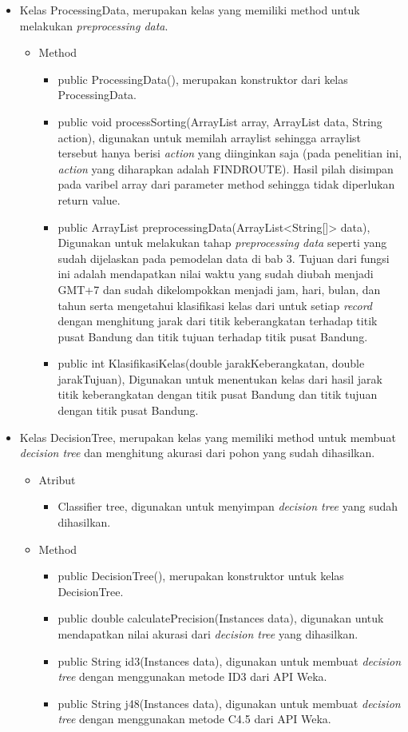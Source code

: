 \begin{itemize}
	\item Kelas ProcessingData, merupakan kelas yang memiliki method untuk melakukan \textsl{preprocessing data}.
	\begin{itemize}
		\item Method
		\begin{itemize}
			\item public ProcessingData(), merupakan konstruktor dari kelas ProcessingData.
			\item public void processSorting(ArrayList array, ArrayList data, String action), digunakan untuk memilah arraylist sehingga arraylist tersebut hanya berisi \textsl{action} yang diinginkan saja (pada penelitian ini, \textsl{action} yang diharapkan adalah FINDROUTE). Hasil pilah disimpan pada varibel array dari parameter method sehingga tidak diperlukan return value.
			\item public ArrayList preprocessingData(ArrayList<String[]> data), Digunakan untuk melakukan tahap \textsl{preprocessing data} seperti yang sudah dijelaskan pada pemodelan data di bab 3. Tujuan dari fungsi ini adalah mendapatkan nilai waktu yang sudah diubah menjadi GMT+7 dan sudah dikelompokkan menjadi jam, hari, bulan, dan tahun serta mengetahui klasifikasi kelas dari untuk setiap \textsl{record} dengan menghitung jarak dari titik keberangkatan terhadap titik pusat Bandung dan titik tujuan terhadap titik pusat Bandung.
			\item public int KlasifikasiKelas(double jarakKeberangkatan, double jarakTujuan), Digunakan untuk menentukan kelas dari hasil jarak titik keberangkatan dengan titik pusat Bandung dan titik tujuan dengan titik pusat Bandung. 
		\end{itemize}
	\end{itemize}

	\item Kelas DecisionTree, merupakan kelas yang memiliki method untuk membuat \textsl{decision tree} dan menghitung akurasi dari pohon yang sudah dihasilkan.
	\begin{itemize}
		\item Atribut
		\begin{itemize}
			\item Classifier tree, digunakan untuk menyimpan \textsl{decision tree} yang sudah dihasilkan.
		\end{itemize}
		\item Method
		\begin{itemize}
			\item public DecisionTree(), merupakan konstruktor untuk kelas DecisionTree.
			\item public double calculatePrecision(Instances data), digunakan untuk mendapatkan nilai akurasi dari \textsl{decision tree} yang dihasilkan.
			\item public String id3(Instances data), digunakan untuk membuat \textsl{decision tree} dengan menggunakan metode ID3 dari API Weka.
			\item public String j48(Instances data), digunakan untuk membuat \textsl{decision tree} dengan menggunakan metode C4.5 dari API Weka.
		\end{itemize}
	\end{itemize}


\end{itemize}
